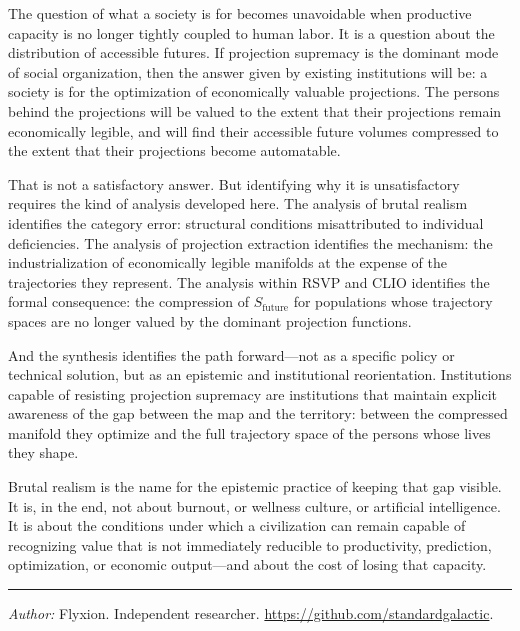 \documentclass[12pt, a4paper]{article}
\theoremstyle{plain}
\theoremstyle{definition}
\theoremstyle{remark}
\begin{document}
The question of what a society is for becomes unavoidable when productive capacity
is no longer tightly coupled to human labor.
It is a question about the distribution of accessible futures.
If projection supremacy is the dominant mode of social organization, then the answer
given by existing institutions will be: a society is for the optimization of
economically valuable projections.
The persons behind the projections will be valued to the extent that their projections
remain economically legible, and will find their accessible future volumes compressed
to the extent that their projections become automatable.

That is not a satisfactory answer.
But identifying why it is unsatisfactory requires the kind of analysis developed here.
The analysis of brutal realism identifies the category error: structural conditions
misattributed to individual deficiencies.
The analysis of projection extraction identifies the mechanism: the industrialization
of economically legible manifolds at the expense of the trajectories they represent.
The analysis within RSVP and CLIO identifies the formal consequence: the compression
of $S_{\mathrm{future}}$ for populations whose trajectory spaces are no longer
valued by the dominant projection functions.

And the synthesis identifies the path forward---not as a specific policy or
technical solution, but as an epistemic and institutional reorientation.
Institutions capable of resisting projection supremacy are institutions that
maintain explicit awareness of the gap between the map and the territory:
between the compressed manifold they optimize and the full trajectory space of
the persons whose lives they shape.

Brutal realism is the name for the epistemic practice of keeping that gap visible.
It is, in the end, not about burnout, or wellness culture, or artificial intelligence.
It is about the conditions under which a civilization can remain capable of
recognizing value that is not immediately reducible to productivity, prediction,
optimization, or economic output---and about the cost of losing that capacity.

\vspace{2em}
\hrule
\vspace{1em}
\noindent\small\textit{Author:} Flyxion. Independent researcher. \url{https://github.com/standardgalactic}.
\end{document}
